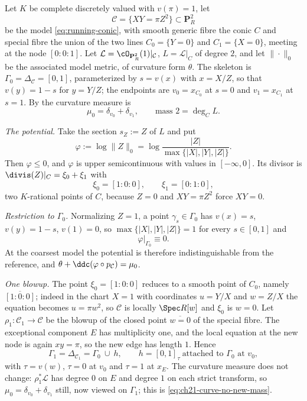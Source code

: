 \begin{example}
\label{ex:ch21-conic-refinement}
Let \(K\) be complete discretely valued with \(v(\pi)=1\), let
\[
 \mathcal C=\{XY=\pi Z^2\}\subset\mathbf P^2_R
\]
be the model \eqref{eq:running-conic}, with smooth generic fibre the conic
\(C\) and special fibre the union of the two lines
\(C_0=\{Y=0\}\) and \(C_1=\{X=0\}\), meeting at the node
\([0:0:1]\).  Let \(\mathcal L=\cO_{\mathbf P^2_R}(1)|_{\mathcal C}\),
\(L=\mathcal L|_C\) of degree \(2\), and let \(\|\cdot\|_0\) be the
associated model metric, of curvature form \(\theta\).  The skeleton is
\(\Gamma_0=\Delta_{\mathcal C}=[0,1]\), parameterized by
\(s=v(x)\) with \(x=X/Z\), so that \(v(y)=1-s\) for \(y=Y/Z\); the
endpoints are \(v_0=x_{C_0}\) at \(s=0\) and \(v_1=x_{C_1}\) at \(s=1\).
By  the curvature measure is
\begin{equation}
\label{eq:ch21-conic-mu0}
 \mu_0=\delta_{v_0}+\delta_{v_1},
 \qquad
 \text{mass }2=\deg_CL .
\end{equation}

\emph{The potential.}  Take the section \(s_Z:=Z\) of \(L\) and put
\[
 \varphi:=\log\lVert Z\rVert_0
 =\log\frac{|Z|}{\max\{|X|,|Y|,|Z|\}} .
\]
Then \(\varphi\leq0\), and \(\varphi\) is upper semicontinuous with values
in \([-\infty,0]\).  Its divisor is
\(\divis(Z)|_C=\xi_0+\xi_1\) with
\[
 \xi_0=[1:0:0],\qquad \xi_1=[0:1:0],
\]
two \(K\)-rational points of \(C\), because \(Z=0\) and \(XY=\pi Z^2\) force
\(XY=0\).

\emph{Restriction to \(\Gamma_0\).}  Normalizing \(Z=1\), a point
\(\gamma_s\in\Gamma_0\) has \(v(x)=s\), \(v(y)=1-s\), \(v(1)=0\), so
\(\max\{|X|,|Y|,|Z|\}=1\) for every \(s\in[0,1]\) and
\begin{equation}
\label{eq:ch21-conic-restriction-0}
 \varphi|_{\Gamma_0}\equiv0 .
\end{equation}
At the coarsest model the potential is therefore indistinguishable from the
reference, and \(\theta+\ddc(\varphi\circ p_{\mathcal C})=\mu_0\).

\emph{One blowup.}  The point \(\xi_0=[1:0:0]\) reduces to a smooth point
of \(C_0\), namely \(\overline{[1:0:0]}\); indeed in the chart \(X=1\) with
coordinates \(u=Y/X\) and \(w=Z/X\) the equation becomes \(u=\pi w^2\), so
\(\mathcal C\) is locally \(\Spec R[w]\) and \(\xi_0\) is \(w=0\).  Let
\(\rho_1:\mathcal C_1\to\mathcal C\) be the blowup of the closed point
\(\overline{w=0}\) of the special fibre.  The exceptional component \(E\) has
multiplicity one, and the local equation at the new node is again
\(xy=\pi\), so the new edge has length \(1\).  Hence
\[
 \Gamma_1=\Delta_{\mathcal C_1}=\Gamma_0\ \cup\ h,
 \qquad h=[0,1]_\tau\ \text{attached to }\Gamma_0\text{ at }v_0,
\]
with \(\tau=v(w)\), \(\tau=0\) at \(v_0\) and \(\tau=1\) at \(x_E\).  The
curvature measure does not change: \(\rho_1^*\mathcal L\) has degree \(0\)
on \(E\) and degree \(1\) on each strict transform, so
\(\mu_0=\delta_{v_0}+\delta_{v_1}\) still, now viewed on \(\Gamma_1\); this
is \eqref{eq:ch21-curve-no-new-mass}.


\end{example}
